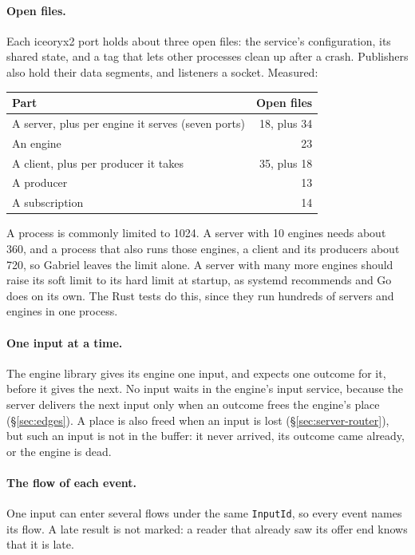 \documentclass[11pt]{article}
\newcommand{\code}[1]{\texttt{#1}}
\begin{document}
\paragraph{Open files.} Each iceoryx2 port holds about three open files: the
service's configuration, its shared state, and a tag that lets other processes
clean up after a crash. Publishers also hold their data segments, and
listeners a socket. Measured:
\begin{center}
\small
\begin{tabular}{@{}lr@{}}
\toprule
Part & Open files \\
\midrule
A server, plus per engine it serves (seven ports) & 18, plus 34 \\
An engine & 23 \\
A client, plus per producer it takes & 35, plus 18 \\
A producer & 13 \\
A subscription & 14 \\
\bottomrule
\end{tabular}
\end{center}
A process is commonly limited to 1024. A server with 10 engines needs about
360, and a process that also runs those engines, a client and its producers
about 720, so Gabriel leaves the limit alone. A server with many more engines
should raise its soft limit to its hard limit at startup, as systemd
recommends and Go does on its own. The Rust tests do this, since they run
hundreds of servers and engines in one process.

\paragraph{One input at a time.} The engine library gives its engine one
input, and expects one outcome for it, before it gives the next. No input waits
in the engine's input service, because the server delivers the next input
only when an outcome frees the engine's place (\S\ref{sec:edges}). A place is
also freed when an input is lost
(\S\ref{sec:server-router}), but such an input is not in the buffer: it never
arrived, its outcome came already, or the engine is dead.

\paragraph{The flow of each event.} One input can enter several flows under
the same \code{InputId}, so every event names its flow. A late result is not
marked: a reader that already saw its offer end knows that it is late.
\end{document}
